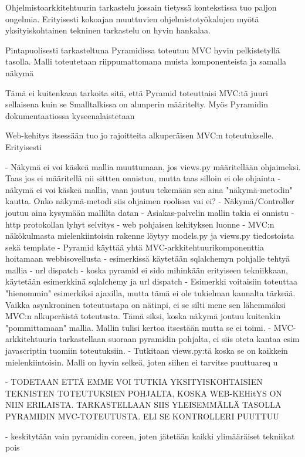 \documentclass[finnish,utf8,nonumbib,palatino,kandi]{gradu2}
\begin{document}
 Ohjelmistoarkkitehtuurin tarkastelu jossain tietyssä kontekstissa tuo paljon ongelmia. Erityisesti kokoajan muuttuvien ohjelmistotyökalujen myötä yksityiskohtainen
tekninen tarkastelu on hyvin hankalaa. 

 Pintapuolisesti tarkasteltuna Pyramidissa toteutuu MVC hyvin pelkistetyllä tasolla. 
 Malli toteutetaan riippumattomana muista komponenteista ja samalla näkymä

Tämä ei kuitenkaan tarkoita sitä, että Pyramid toteuttaisi MVC:tä juuri sellaisena kuin se Smalltalkissa on alunperin määritelty. Myös
Pyramidin dokumentaatiossa kyseenalaistetaan 




 Web-kehitys
itsessään tuo jo rajoitteita alkuperäisen MVC:n toteutukselle. Erityisesti 

- Näkymä ei voi käskeä mallia muuttumaan, jos views.py määritellään ohjaimeksi. Taas jos ei määritellä nii sittten onnistuu, mutta taas silloin ei ole ohjainta
- näkymä ei voi käskeä mallia, vaan joutuu tekemään sen aina "näkymä-metodin" kautta. Onko näkymä-metodi siis ohjaimen roolissa vai ei?
- Näkymä/Controller joutuu aina kysymään mallilta datan
- Asiakas-palvelin mallin takia ei onnistu
- http protokollan lyhyt selvitys
- web pohjaisen kehityksen luonne
- MVC:n näkökulmasta mielenkiintoisin rakenne löytyy models.py ja views.py tiedostoista sekä template
- Pyramid käyttää yhtä MVC-arkkitehtuurikomponenttia hoitamaan webbisovellusta
- esimerkissä käytetään sqlalchemyn pohjalle tehtyä mallia
- url dispatch
- koska pyramid ei sido mihinkään erityiseen tekniikkaan, käytetään esimerkkinä sqlalchemy ja url dispatch
- Esimerkki voitaisiin toteuttaa "hienommin" esimerkiksi ajaxilla, mutta tämä ei ole tukielman kannalta tärkeää. Vaikka
asynkroninen toteutustapa on nätinpi, ei se silti mene sen lähemmäksi MVC:n alkuperäistä toteutusta. Tämä siksi,
koska näkymä joutuu kuitenkin "pommittamaan" mallia. Mallin tulisi kertoa itsestään mutta se ei toimi.
- MVC-arkkitehtuuria tarkastellaan suoraan pyramidin pohjalta, ei siis oteta kantaa esim javascriptin tuomiin 
toteutuksiin.
- Tutkitaan views.py:tä koska se on kaikkein mielenkiintoisin. Malli on hyvin selkeä, joten siihen ei tarvitse puuttuareq	u

- TODETAAN ETTÄ EMME VOI TUTKIA YKSITYISKOHTAISIEN TEKNISTEN TOTEUTUKSIEN POHJALTA, KOSKA WEB-KEHitYS ON NIIN ERILAISTA. TARKASTELLAAN
SIIS YLEISEMMÄLLÄ TASOLLA PYRAMIDIN MVC-TOTEUTUSTA. ELI SE KONTROLLERI PUUTTUU

- keskitytään vain pyramidin coreen, joten jätetään kaikki ylimääräiset tekniikat pois
\end{document}
